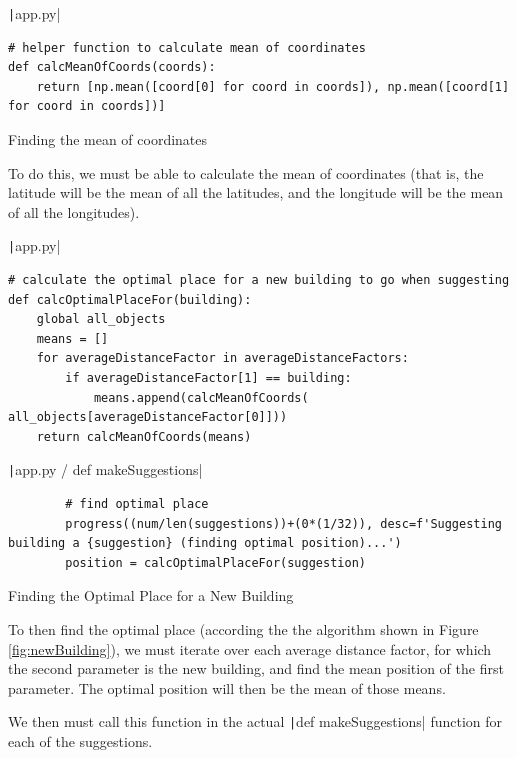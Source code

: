 \documentclass[12pt]{report}
\newcommand{\pil}[1]{\protect\texttt|#1|}
\begin{document}
\begin{listing}[H]
\pil{app.py}
\begin{verbatim}
# helper function to calculate mean of coordinates
def calcMeanOfCoords(coords):
    return [np.mean([coord[0] for coord in coords]), np.mean([coord[1] for coord in coords])]
\end{verbatim}
\caption{Finding the mean of coordinates}\label{cs:meanOfCoordinates}
\end{listing}

To do this, we must be able to calculate the mean of coordinates (that is, the latitude will be the mean of all the latitudes, and the longitude will be the mean of all the longitudes).

\begin{listing}[H]
\pil{app.py}
\begin{verbatim}
# calculate the optimal place for a new building to go when suggesting
def calcOptimalPlaceFor(building):
    global all_objects
    means = []
    for averageDistanceFactor in averageDistanceFactors:
        if averageDistanceFactor[1] == building:
            means.append(calcMeanOfCoords( all_objects[averageDistanceFactor[0]]))
    return calcMeanOfCoords(means)
\end{verbatim}
\pil{app.py / def makeSuggestions}
\begin{verbatim}
        # find optimal place
        progress((num/len(suggestions))+(0*(1/32)), desc=f'Suggesting building a {suggestion} (finding optimal position)...')
        position = calcOptimalPlaceFor(suggestion)
\end{verbatim}
\caption{Finding the Optimal Place for a New Building}\label{cs:optimalPlaceForNewBuilding}
\end{listing}

To then find the optimal place (according the the algorithm shown in Figure \ref{fig:newBuilding}), we must iterate over each average distance factor, for which the second parameter is the new building, and find the mean position of the first parameter. The optimal position will then be the mean of those means.

We then must call this function in the actual \pil{def makeSuggestions} function for each of the suggestions.
\end{document}

